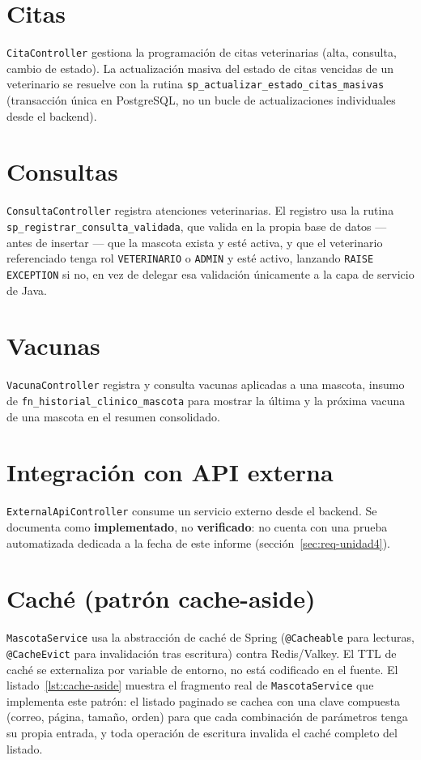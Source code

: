 \section{Citas}

\texttt{CitaController} gestiona la programaci\'on de citas veterinarias
(alta, consulta, cambio de estado). La actualizaci\'on masiva del estado de
citas vencidas de un veterinario se resuelve con la rutina
\texttt{sp\_actualizar\_estado\_citas\_masivas} (transacci\'on \'unica en
PostgreSQL, no un bucle de actualizaciones individuales desde el backend).

\section{Consultas}

\texttt{ConsultaController} registra atenciones veterinarias. El registro
usa la rutina \texttt{sp\_registrar\_consulta\_validada}, que valida en la
propia base de datos --- antes de insertar --- que la mascota exista y
est\'e activa, y que el veterinario referenciado tenga rol
\texttt{VETERINARIO} o \texttt{ADMIN} y est\'e activo, lanzando
\texttt{RAISE EXCEPTION} si no, en vez de delegar esa validaci\'on
\'unicamente a la capa de servicio de Java.

\section{Vacunas}

\texttt{VacunaController} registra y consulta vacunas aplicadas a una
mascota, insumo de \texttt{fn\_historial\_clinico\_mascota} para mostrar la
\'ultima y la pr\'oxima vacuna de una mascota en el resumen consolidado.

\section{Integraci\'on con API externa}

\texttt{ExternalApiController} consume un servicio externo desde el
backend. Se documenta como \textbf{implementado}, no \textbf{verificado}:
no cuenta con una prueba automatizada dedicada a la fecha de este informe
(secci\'on~\ref{sec:req-unidad4}).

\section{Cach\'e (patr\'on cache-aside)}

\texttt{MascotaService} usa la abstracci\'on de cach\'e de Spring
(\texttt{@Cacheable} para lecturas, \texttt{@CacheEvict} para
invalidaci\'on tras escritura) contra Redis/Valkey. El TTL de cach\'e se
externaliza por variable de entorno, no est\'a codificado en el fuente.
El listado~\ref{lst:cache-aside} muestra el fragmento real de
\texttt{MascotaService} que implementa este patr\'on: el listado paginado
se cachea con una clave compuesta (correo, p\'agina, tama\~no, orden) para
que cada combinaci\'on de par\'ametros tenga su propia entrada, y toda
operaci\'on de escritura invalida el cach\'e completo del listado.

